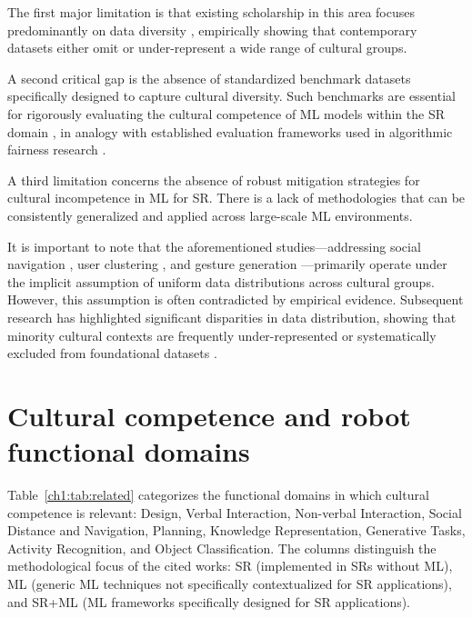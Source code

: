The first major limitation is that existing scholarship in this area focuses predominantly on data diversity \citep{not_uniform_data, seaborn2023not, lim2021social, hagerty2019global, stacy2025data, ijerph21121642, li2024health, lee2024negotiating, zhang2024ameliorating, blanchard2015socio, thakkar2024artificial}, empirically showing that contemporary datasets either omit or under-represent a wide range of cultural groups.

A second critical gap is the absence of standardized benchmark datasets specifically designed to capture cultural diversity. Such benchmarks are essential for rigorously evaluating the cultural competence of ML models within the SR domain \citep{Facial_recogn_eval_datasets, BiasDataset, not_uniform_data, seaborn2023not, lim2021social, hagerty2019global, stacy2025data, ijerph21121642, li2024health, lee2024negotiating, zhang2024ameliorating, blanchard2015socio, thakkar2024artificial}, in analogy with established evaluation frameworks used in algorithmic fairness research \citep{le2022survey}.

A third limitation concerns the absence of robust mitigation strategies for cultural incompetence in ML for SR. There is a lack of methodologies that can be consistently generalized and applied across large-scale ML environments.

It is important to note that the aforementioned studies—addressing social navigation \citep{patompak2017learning}, user clustering \citep{santos2018extended}, and gesture generation \citep{Gestures}—primarily operate under the implicit assumption of uniform data distributions across cultural groups. However, this assumption is often contradicted by empirical evidence. Subsequent research has highlighted significant disparities in data distribution, showing that minority cultural contexts are frequently under-represented or systematically excluded from foundational datasets \citep{not_uniform_data, seaborn2023not, lim2021social, hagerty2019global, stacy2025data, ijerph21121642, li2024health, lee2024negotiating, zhang2024ameliorating, blanchard2015socio, thakkar2024artificial}.

\section{Cultural competence and robot functional domains}
Table~\ref{ch1:tab:related} categorizes the functional domains in which cultural competence is relevant: Design, Verbal Interaction, Non-verbal Interaction, Social Distance and Navigation, Planning, Knowledge Representation, Generative Tasks, Activity Recognition, and Object Classification. The columns distinguish the methodological focus of the cited works: SR (implemented in SRs without ML), ML (generic ML techniques not specifically contextualized for SR applications), and SR+ML (ML frameworks specifically designed for SR applications).

